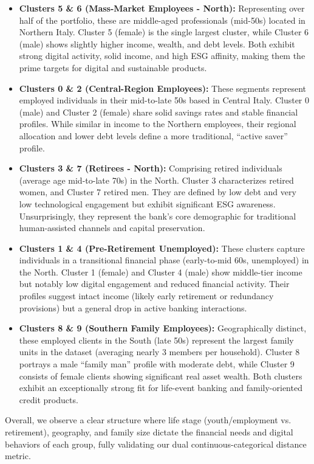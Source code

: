 \documentclass[9pt,a4paper,twocolumn,twoside]{rho-class/rho}
\begin{document}
\begin{itemize}
    \item \textbf{Clusters 5 \& 6 (Mass-Market Employees - North):} Representing over half of the portfolio, these are middle-aged professionals (mid-50s) located in Northern Italy. Cluster 5 (female) is the single largest cluster, while Cluster 6 (male) shows slightly higher income, wealth, and debt levels. Both exhibit strong digital activity, solid income, and high ESG affinity, making them the prime targets for digital and sustainable products.
    \item \textbf{Clusters 0 \& 2 (Central-Region Employees):} These segments represent employed individuals in their mid-to-late 50s based in Central Italy. Cluster 0 (male) and Cluster 2 (female) share solid savings rates and stable financial profiles. While similar in income to the Northern employees, their regional allocation and lower debt levels define a more traditional, ``active saver'' profile.
    \item \textbf{Clusters 3 \& 7 (Retirees - North):} Comprising retired individuals (average age mid-to-late 70s) in the North. Cluster 3 characterizes retired women, and Cluster 7 retired men. They are defined by low debt and very low technological engagement but exhibit significant ESG awareness. Unsurprisingly, they represent the bank's core demographic for traditional human-assisted channels and capital preservation.
    \item \textbf{Clusters 1 \& 4 (Pre-Retirement Unemployed):} These clusters capture individuals in a transitional financial phase (early-to-mid 60s, unemployed) in the North. Cluster 1 (female) and Cluster 4 (male) show middle-tier income but notably low digital engagement and reduced financial activity. Their profiles suggest intact income (likely early retirement or redundancy provisions) but a general drop in active banking interactions.
    \item \textbf{Clusters 8 \& 9 (Southern Family Employees):} Geographically distinct, these employed clients in the South (late 50s) represent the largest family units in the dataset (averaging nearly 3 members per household). Cluster 8 portrays a male ``family man'' profile with moderate debt, while Cluster 9 consists of female clients showing significant real asset wealth. Both clusters exhibit an exceptionally strong fit for life-event banking and family-oriented credit products.
\end{itemize}

Overall, we observe a clear structure where life stage (youth/employment vs. retirement), geography, and family size dictate the financial needs and digital behaviors of each group, fully validating our dual continuous-categorical distance metric.
\end{document}

